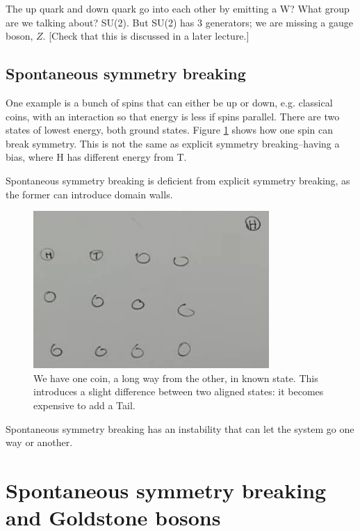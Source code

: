 \documentclass[]{article}
\begin{document}
The up quark and down quark go into each other by emitting a W? What group are we talking about? SU(2). But SU(2) has 3 generators; we are missing a gauge boson, $Z$. [Check that this is discussed in a later lecture.]

\subsection{Spontaneous symmetry breaking}
 
 One example is a bunch of spins that can either be up or down, e.g. classical coins, with an interaction so that energy is less if spins parallel. There are two states of lowest energy, both ground states. Figure \ref{fig:2-6-sponteneous} shows how one spin can break symmetry. This is not the same as explicit symmetry breaking--having a bias, where H has different energy from T.
 
 Spontaneous symmetry breaking is deficient from explicit symmetry breaking, as the former can introduce domain walls.
 \begin{figure}[H]
 	\begin{center}
 		\caption[Spontaneous symmetry breaking]{We have one coin, a long way from the other, in known state. This introduces a slight difference between two aligned states: it becomes expensive to add a Tail.}\label{fig:2-6-sponteneous}
 		\includegraphics[width=0.8\textwidth]{2-6-sponteneous}
 	\end{center}
 \end{figure}

Spontaneous symmetry breaking has an instability that can let the system go one way or another.

\section{Spontaneous symmetry breaking and Goldstone bosons}
\end{document}
